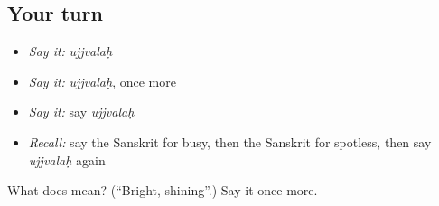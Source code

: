 \subsection*{Your turn}
\begin{itemize}
\raggedright
  \item \emph{Say it:} \emph{ujjvalaḥ}
  \item \emph{Say it:} \emph{ujjvalaḥ}, once more
  \item \emph{Say it:} say \emph{ujjvalaḥ}
  \item \emph{Recall:} say the Sanskrit for busy, then the Sanskrit for spotless, then say \emph{ujjvalaḥ} again
\end{itemize}

\begin{tcolorbox}[breakable,colback=teal!4,colframe=teal!35!black,title={Before you move on}]
What does  mean? (\textquotedblleft{}Bright, shining\textquotedblright{}.) Say it once more.
\end{tcolorbox}
